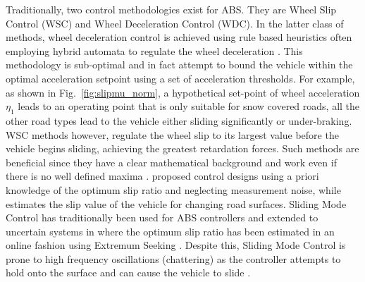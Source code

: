 \documentclass[onecolumn,journal,draftclsnofoot]{IEEEtran}
\begin{document}
Traditionally, two control methodologies exist for ABS.
They are Wheel Slip Control (WSC) and Wheel Deceleration Control (WDC). 
In the latter class of methods, wheel deceleration control is achieved using rule based heuristics often employing hybrid automata to regulate the wheel deceleration \cite{Gerard2012,Pasillas2006,Kuo1992}. %
This methodology is sub-optimal and in fact attempt to bound the vehicle within the optimal acceleration setpoint using a set of acceleration thresholds. For example, as shown in Fig.~\ref{fig:slipmu_norm}, a hypothetical set-point of wheel acceleration \(\eta_1\) leads to an operating point that is only suitable for snow covered roads, all the other road types lead to the vehicle either sliding significantly or under-braking. 
\IEEEpubidadjcol
WSC methods however, regulate the wheel slip to its largest value before the vehicle begins sliding, achieving the greatest retardation forces. Such methods are beneficial since they have a clear mathematical background and work even if there is no well defined maxima \cite{Pasillas-Lepine2006}.
\cite{Mirzaeinejad2010,Mi2005,Harifi2008} proposed control designs using a priori knowledge of the optimum slip ratio and neglecting measurement noise, while \cite{Rattasiri2007,Zhao2006, Mirzaeinejad2014} estimates the slip value of the vehicle for changing road surfaces. %
Sliding Mode Control has traditionally been used for ABS controllers \cite{Tan1990,Chin1992,Haskara2000} and extended to uncertain systems in \cite{Drakunov1995} where the optimum slip ratio has been estimated in an online fashion using Extremum Seeking \cite{KarticB.Ariyur2004,Dincmen2010,Dincmen2014}. %
Despite this, Sliding Mode Control is prone to high frequency oscillations (chattering) as the controller attempts to hold onto the surface and can cause the vehicle to slide \cite{Mirzaeinejad2014}.
\end{document}
